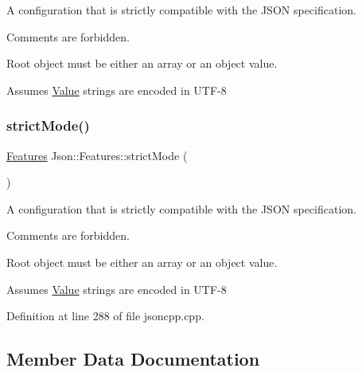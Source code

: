 A configuration that is strictly compatible with the J\+S\+ON specification. 


\begin{DoxyItemize}
\item Comments are forbidden.
\item Root object must be either an array or an object value.
\item Assumes \hyperlink{class_json_1_1_value}{Value} strings are encoded in U\+T\+F-\/8 
\end{DoxyItemize}\hypertarget{class_json_1_1_features_ae23176c14b2e79e81fb61fb1a8ab58ee}{}\label{class_json_1_1_features_ae23176c14b2e79e81fb61fb1a8ab58ee} 
\subsubsection{\texorpdfstring{strict\+Mode()}{strictMode()}\hspace{0.1cm}{\footnotesize\ttfamily [2/2]}}
{\footnotesize\ttfamily \hyperlink{class_json_1_1_features}{Features} Json\+::\+Features\+::strict\+Mode (\begin{DoxyParamCaption}{ }\end{DoxyParamCaption})\hspace{0.3cm}{\ttfamily [static]}}



A configuration that is strictly compatible with the J\+S\+ON specification. 


\begin{DoxyItemize}
\item Comments are forbidden.
\item Root object must be either an array or an object value.
\item Assumes \hyperlink{class_json_1_1_value}{Value} strings are encoded in U\+T\+F-\/8 
\end{DoxyItemize}

Definition at line 288 of file jsoncpp.\+cpp.



\subsection{Member Data Documentation}
\hypertarget{class_json_1_1_features_a33afd389719624b6bdb23950b3c346c9}{}\label{class_json_1_1_features_a33afd389719624b6bdb23950b3c346c9} 
